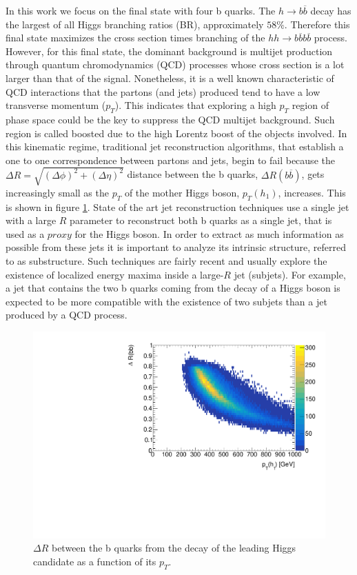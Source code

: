 In this work we focus on the final state with four b quarks. The $h\rightarrow b\overline{b}$ decay has the largest of all Higgs branching ratios (BR), approximately $58\%$. Therefore this final state maximizes the cross section times branching of the $hh\rightarrow b\overline{b}b\overline{b}$ process. However, for this final state, the dominant background is multijet production through quantum chromodynamics (QCD) processes whose cross section is a lot larger than that of the signal. Nonetheless, it is a well known characteristic of QCD interactions that the partons (and jets) produced tend to have a low transverse momentum ($p_T$). This indicates that exploring a high $p_T$ region of phase space could be the key to suppress the QCD multijet background. Such region is called boosted due to the high Lorentz boost of the objects involved. In this kinematic regime, traditional jet reconstruction algorithms, that establish a one to one correspondence between partons and jets, begin to fail because the $\Delta R=\sqrt{(\Delta\phi)^2+(\Delta\eta)^2}$ distance between the b quarks, $\Delta R(b\overline{b})$, gets increasingly small as the $p_T$ of the mother Higgs boson, $p_T(h_1)$, increases. This is shown in figure \ref{fig:deltaRbb_pt}. State of the art jet reconstruction techniques \cite{jetsub} use a single jet with a large $R$ parameter to reconstruct both b quarks as a single jet, that is used as a $\textit{proxy}$ for the Higgs boson. In order to extract as much information as possible from these jets it is important to analyze its intrinsic structure, referred to as substructure. Such techniques are fairly recent and usually explore the existence of localized energy maxima inside a large-$R$ jet (subjets). For example, a jet that contains the two b quarks coming from the decay of a Higgs boson is expected to be more compatible with the existence of two subjets than a jet produced by a QCD process.

\begin{figure}[h]
	\centering
	\includegraphics[trim={.5cm 0 0 0},clip,width=\linewidth]{./images/hist_deltaR_bb_pt.pdf}
	\caption{$\Delta R$ between the b quarks from the decay of the leading Higgs candidate as a function of its $p_T$.}
	\label{fig:deltaRbb_pt}
\end{figure}

